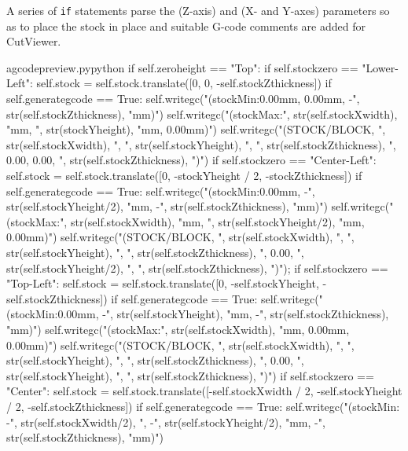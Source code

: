\documentclass{ltxdoc}
\begin{document}
\noindent A series of \verb|if| statements parse the  (Z-axis) and  (X- and Y-axes) parameters so as to place the stock in place and suitable G-code comments are added for CutViewer.

\lstset{firstnumber=\thegcpy}
\begin{writecode}{a}{gcodepreview.py}{python}
        if self.zeroheight == "Top":
            if self.stockzero == "Lower-Left":
                self.stock = self.stock.translate([0, 0, -self.stockZthickness])
                if self.generategcode == True:
                    self.writegc("(stockMin:0.00mm, 0.00mm, -", str(self.stockZthickness), "mm)")
                    self.writegc("(stockMax:", str(self.stockXwidth), "mm, ", str(stockYheight), "mm, 0.00mm)")
                    self.writegc("(STOCK/BLOCK, ", str(self.stockXwidth), ", ", str(self.stockYheight), ", ", str(self.stockZthickness), ", 0.00, 0.00, ", str(self.stockZthickness), ")")
            if self.stockzero == "Center-Left":
                self.stock = self.stock.translate([0, -stockYheight / 2, -stockZthickness])
                if self.generategcode == True:
                    self.writegc("(stockMin:0.00mm, -", str(self.stockYheight/2), "mm, -", str(self.stockZthickness), "mm)")
                    self.writegc("(stockMax:", str(self.stockXwidth), "mm, ", str(self.stockYheight/2), "mm, 0.00mm)")
                    self.writegc("(STOCK/BLOCK, ", str(self.stockXwidth), ", ", str(self.stockYheight), ", ", str(self.stockZthickness), ", 0.00, ", str(self.stockYheight/2), ", ", str(self.stockZthickness), ")");
            if self.stockzero == "Top-Left":
                self.stock = self.stock.translate([0, -self.stockYheight, -self.stockZthickness])
                if self.generategcode == True:
                    self.writegc("(stockMin:0.00mm, -", str(self.stockYheight), "mm, -", str(self.stockZthickness), "mm)")
                    self.writegc("(stockMax:", str(self.stockXwidth), "mm, 0.00mm, 0.00mm)")
                    self.writegc("(STOCK/BLOCK, ", str(self.stockXwidth), ", ", str(self.stockYheight), ", ", str(self.stockZthickness), ", 0.00, ", str(self.stockYheight), ", ", str(self.stockZthickness), ")")
            if self.stockzero == "Center":
                self.stock = self.stock.translate([-self.stockXwidth / 2, -self.stockYheight / 2, -self.stockZthickness])
                if self.generategcode == True:
                    self.writegc("(stockMin: -", str(self.stockXwidth/2), ", -", str(self.stockYheight/2), "mm, -", str(self.stockZthickness), "mm)")

\end{writecode}
\end{document}
